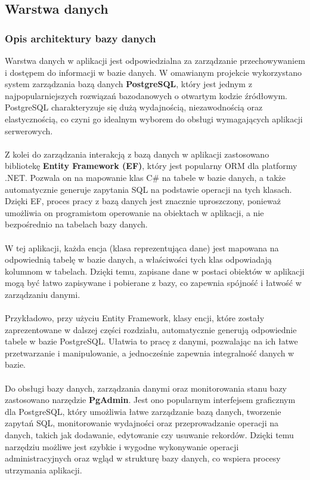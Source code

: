 \documentclass[12pt,a4paper]{article}
\begin{document}
\newpage

\subsection{Warstwa danych}

\subsubsection{Opis architektury bazy danych}

Warstwa danych w aplikacji jest odpowiedzialna za zarządzanie przechowywaniem i dostępem do informacji w bazie danych. W omawianym projekcie wykorzystano system zarządzania bazą danych \textbf{PostgreSQL}, który jest jednym z najpopularniejszych rozwiązań bazodanowych o otwartym kodzie źródłowym. PostgreSQL charakteryzuje się dużą wydajnością, niezawodnością oraz elastycznością, co czyni go idealnym wyborem do obsługi wymagających aplikacji serwerowych.
\\\\
Z kolei do zarządzania interakcją z bazą danych w aplikacji zastosowano bibliotekę \textbf{Entity Framework (EF)}, który jest popularny ORM dla platformy .NET. Pozwala on na mapowanie klas C\# na tabele w bazie danych, a także automatycznie generuje zapytania SQL na podstawie operacji na tych klasach. Dzięki EF, proces pracy z bazą danych jest znacznie uproszczony, ponieważ umożliwia on programistom operowanie na obiektach w aplikacji, a nie bezpośrednio na tabelach bazy danych.
\\\\
W tej aplikacji, każda encja (klasa reprezentująca dane) jest mapowana na odpowiednią tabelę w bazie danych, a właściwości tych klas odpowiadają kolumnom w tabelach. Dzięki temu, zapisane dane w postaci obiektów w aplikacji mogą być łatwo zapisywane i pobierane z bazy, co zapewnia spójność i łatwość w zarządzaniu danymi.
\\\\
Przykładowo, przy użyciu Entity Framework, klasy encji, które zostały zaprezentowane w dalszej części rozdziału, automatycznie generują odpowiednie tabele w bazie PostgreSQL. Ułatwia to pracę z danymi, pozwalając na ich łatwe przetwarzanie i manipulowanie, a jednocześnie zapewnia integralność danych w bazie.
\\\\
Do obsługi bazy danych, zarządzania danymi oraz monitorowania stanu bazy zastosowano narzędzie \textbf{PgAdmin}. Jest ono popularnym interfejsem graficznym dla PostgreSQL, który umożliwia łatwe zarządzanie bazą danych, tworzenie zapytań SQL, monitorowanie wydajności oraz przeprowadzanie operacji na danych, takich jak dodawanie, edytowanie czy usuwanie rekordów. Dzięki temu narzędziu możliwe jest szybkie i wygodne wykonywanie operacji administracyjnych oraz wgląd w strukturę bazy danych, co wspiera procesy utrzymania aplikacji.
\end{document}
